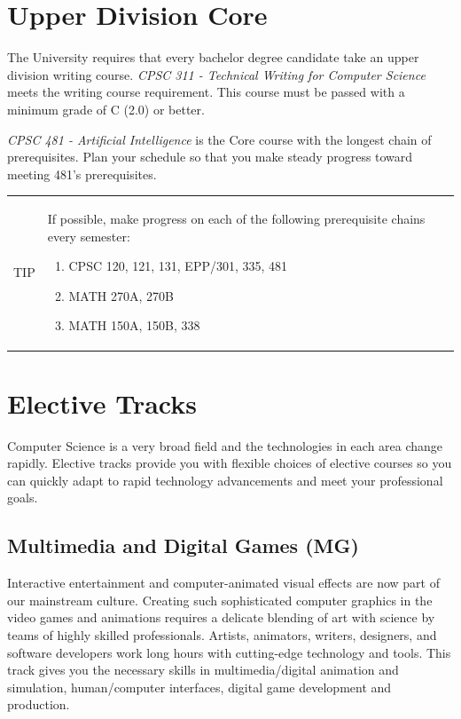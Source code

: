 \documentclass{book}
\newenvironment{tip}{
  \tcolorbox \begin{tabular}{m{.5in} m{5.25in}}
    \Large{TIP} &
}{
  \end{tabular} \endtcolorbox
}
\newcommand{\MgTrackName}{Multimedia and Digital Games (MG)}
\begin{document}
\section{Upper Division Core}

The University requires that every bachelor degree candidate take an upper division writing course. \emph{CPSC 311 - Technical Writing for Computer Science} meets the writing course requirement. This course must be passed with a minimum grade of C (2.0) or better.

\emph{CPSC 481 - Artificial Intelligence} is the Core course with the longest chain of prerequisites. Plan your schedule so that you make steady progress toward meeting 481's prerequisites.

\begin{tip}
  If possible, make progress on each of the following prerequisite chains every semester:
  \begin{enumerate}
  \item CPSC 120, 121, 131, EPP/301, 335, 481
  \item MATH 270A, 270B
  \item MATH 150A, 150B, 338
  \end{enumerate}
\end{tip}

\section{Elective Tracks}
 
Computer Science is a very broad field and the technologies in each area change rapidly. Elective tracks provide you with flexible choices of elective courses so you can quickly adapt to rapid technology advancements and meet your professional goals.


\subsection{\MgTrackName}
\MgTrackIndex
Interactive entertainment and computer-animated visual effects are now part of our mainstream culture. Creating such sophisticated computer graphics in the video games and animations requires a delicate blending of art with science by teams of highly skilled professionals. Artists, animators, writers, designers, and software developers work long hours with cutting-edge technology and tools. This track gives you the necessary skills in multimedia/digital animation and simulation, human/computer interfaces, digital game development and production.
\end{document}

